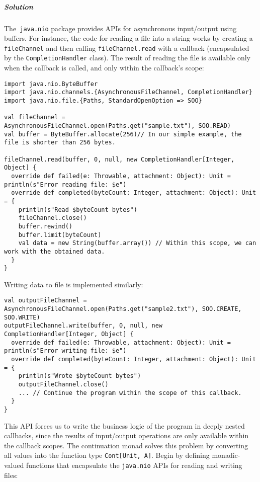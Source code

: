 \subparagraph{Solution}

The\lstinline! java.nio! package provides APIs for asynchronous input/output
using buffers. For instance, the code for reading a file into a string
works by creating a \lstinline!fileChannel! and then calling \lstinline!fileChannel.read!
with a callback (encapsulated by the \lstinline!CompletionHandler!
class). The result of reading the file is available only when the
callback is called, and only within the callback\textsf{'}s scope:
\begin{lstlisting}
import java.nio.ByteBuffer
import java.nio.channels.{AsynchronousFileChannel, CompletionHandler}
import java.nio.file.{Paths, StandardOpenOption => SOO}

val fileChannel = AsynchronousFileChannel.open(Paths.get("sample.txt"), SOO.READ)
val buffer = ByteBuffer.allocate(256)// In our simple example, the file is shorter than 256 bytes.

fileChannel.read(buffer, 0, null, new CompletionHandler[Integer, Object] {
  override def failed(e: Throwable, attachment: Object): Unit = println(s"Error reading file: $e")
  override def completed(byteCount: Integer, attachment: Object): Unit = {
    println(s"Read $byteCount bytes")
    fileChannel.close()
    buffer.rewind()
    buffer.limit(byteCount)
    val data = new String(buffer.array()) // Within this scope, we can work with the obtained data.
  }
}
\end{lstlisting}
Writing data to file is implemented similarly:
\begin{lstlisting}
val outputFileChannel = AsynchronousFileChannel.open(Paths.get("sample2.txt"), SOO.CREATE, SOO.WRITE)
outputFileChannel.write(buffer, 0, null, new CompletionHandler[Integer, Object] {
  override def failed(e: Throwable, attachment: Object): Unit = println(s"Error writing file: $e")
  override def completed(byteCount: Integer, attachment: Object): Unit = {
    println(s"Wrote $byteCount bytes")
    outputFileChannel.close()
    ... // Continue the program within the scope of this callback.
  }
}
\end{lstlisting}
This API forces us to write the business logic of the program in deeply
nested callbacks, since the results of input/output operations are
only available within the callback scopes. The continuation monad
solves this problem by converting all values into the function type
\lstinline!Cont[Unit, A]!. Begin by defining monadic-valued functions
that encapsulate the \lstinline!java.nio! APIs for reading and writing
files:
